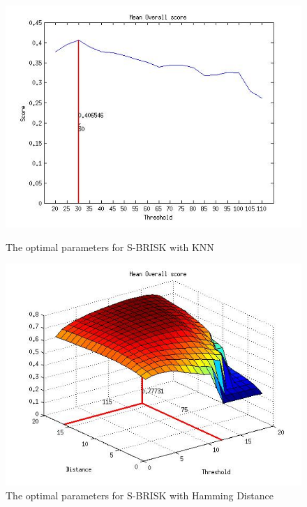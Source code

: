 \documentclass{article}
\begin{document}
\begin{figure}[h!]
\begin{minipage}[b]{0.5\linewidth}
\includegraphics[scale=0.5]{../Drawings/OptimalParameters_SBRISK_SBRISK_KNN.jpg}
\caption{The optimal parameters for S-BRISK with KNN}
\label{fig:sbriskknnOptimal}
\end{minipage}
\hspace{0.5cm}
\begin{minipage}[b]{0.5\linewidth}
\includegraphics[scale=0.5]{../Drawings/OptimalParameters_SBRISK_SBRISK_hamming.jpg}
\caption{The optimal parameters for S-BRISK with Hamming Distance}
\label{fig:sbriskHammingOptimal}
\end{minipage}

\end{figure}
\end{document}
